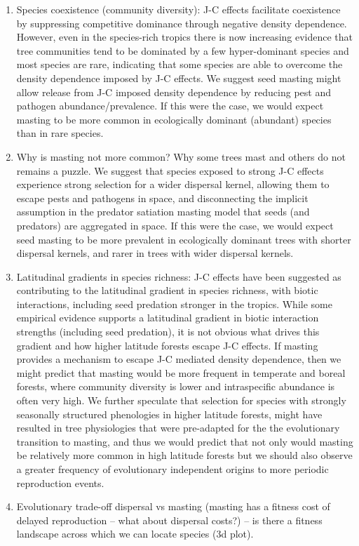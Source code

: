 \documentclass[11pt]{article}
\begin{document}
\begin{enumerate}
    \item Species coexistence (community diversity): J-C effects facilitate coexistence by suppressing competitive dominance through negative density dependence. However, even in the species-rich tropics there is now increasing evidence that tree communities tend to be dominated by a few hyper-dominant species and most species are rare, indicating that some species are able to overcome the density dependence imposed by J-C effects. We suggest seed masting might allow release from J-C imposed density dependence by reducing pest and pathogen abundance/prevalence. If this were the case, we would expect masting to be more common in ecologically dominant (abundant) species than in rare species.
    \item Why is masting not more common? Why some trees mast and others do not remains a puzzle. We suggest that species exposed to strong J-C effects experience strong selection for a wider dispersal kernel, allowing them to escape pests and pathogens in space, and disconnecting the implicit assumption in the predator satiation masting model that seeds (and predators) are aggregated in space. If this were the case, we would expect seed masting to be more prevalent in ecologically dominant trees with shorter dispersal kernels, and rarer in trees with wider dispersal kernels.
    \item Latitudinal gradients in species richness: J-C effects have been suggested as contributing to the latitudinal gradient in species richness, with biotic interactions, including seed predation stronger in the tropics. While some empirical evidence supports a latitudinal gradient in biotic interaction strengths (including seed predation), it is not obvious what drives this gradient and how higher latitude forests escape J-C effects. If masting provides a mechanism to escape J-C mediated density dependence, then we might predict that masting would be more frequent in temperate and boreal forests, where community diversity is lower and intraspecific abundance is often very high. We further speculate that selection for species with strongly seasonally structured phenologies in higher latitude forests, might have resulted in tree physiologies that were pre-adapted for the the evolutionary transition to masting, and thus we would predict that not only would masting be relatively more common in high latitude forests but we should also observe a greater frequency of evolutionary independent origins to more periodic reproduction events.
    \item Evolutionary trade-off dispersal vs masting (masting has a fitness cost of delayed reproduction – what about dispersal costs?) – is there a fitness landscape across which we can locate species (3d plot).
\end{enumerate}
\end{document}
